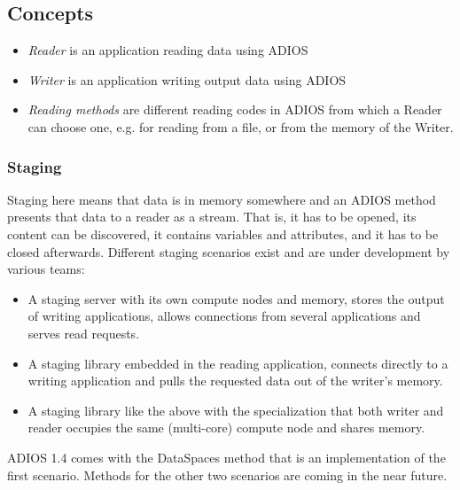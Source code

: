 \subsection{Concepts}

\begin{itemize}
    \item {\em Reader} is an application reading data using ADIOS
    \item {\em Writer} is an application writing output data using ADIOS
    \item {\em Reading methods} are different reading codes in ADIOS from which a Reader can choose one, e.g. for reading from a file, or from the memory of the Writer. 
\end{itemize}


\subsubsection{Staging}
Staging here means that data is in memory somewhere and an ADIOS method presents that data to a reader as a stream. That is, it has to be opened, its content can be discovered, it contains variables and attributes, and it has to be closed afterwards. Different staging scenarios exist and are under development by various teams:

\begin{itemize}
    \item A staging server with its own compute nodes and memory, stores the output of writing applications, allows connections from several applications and serves read requests. 
    \item A staging library embedded in the reading application, connects directly to a writing application and pulls the requested data out of the writer's memory. 
    \item A staging library like the above with the specialization that both writer and reader occupies the same (multi-core) compute node and shares memory.   
\end{itemize}

\noindent ADIOS 1.4 comes with the DataSpaces method that is an implementation of the first scenario. Methods for the other two scenarios are coming in the near future. 

